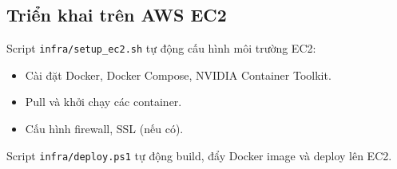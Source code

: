 \subsection{Triển khai trên AWS EC2}

Script \texttt{infra/setup\_ec2.sh} tự động cấu hình môi trường EC2:
\begin{itemize}
    \item Cài đặt Docker, Docker Compose, NVIDIA Container Toolkit.
    \item Pull và khởi chạy các container.
    \item Cấu hình firewall, SSL (nếu có).
\end{itemize}

Script \texttt{infra/deploy.ps1} tự động build, đẩy Docker image và deploy lên EC2.
